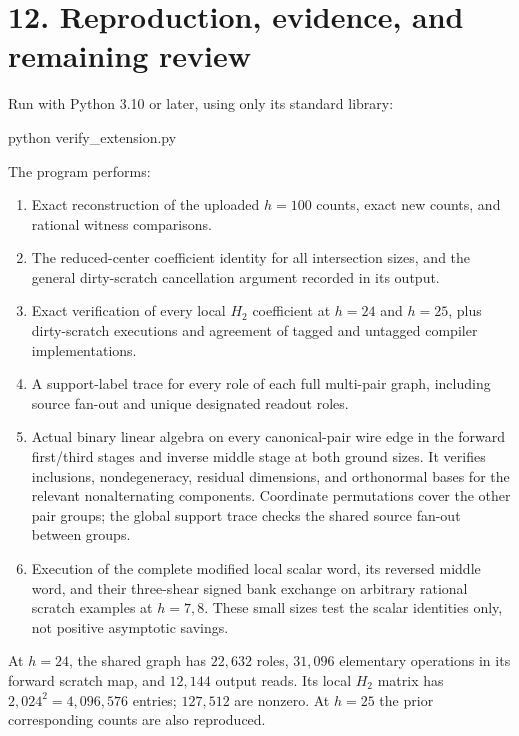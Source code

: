 \documentclass[
  11pt,
  letterpaper,
]{article}
\newenvironment{Shaded}{}{}
\newcommand{\ExtensionTok}[1]{#1}
\newcommand{\NormalTok}[1]{#1}
\begin{document}
\section{12. Reproduction, evidence, and remaining
review}\label{reproduction-evidence-and-remaining-review}

Run with Python 3.10 or later, using only its standard library:

\begin{Shaded}
\begin{Highlighting}[]
\ExtensionTok{python}\NormalTok{ verify\_extension.py}
\end{Highlighting}
\end{Shaded}

The program performs:

\begin{enumerate}
\def\labelenumi{\arabic{enumi}.}
\item
  Exact reconstruction of the uploaded \(h=100\) counts, exact new
  counts, and rational witness comparisons.
\item
  The reduced-center coefficient identity for all intersection sizes,
  and the general dirty-scratch cancellation argument recorded in its
  output.
\item
  Exact verification of every local \(H_2\) coefficient at \(h=24\) and
  \(h=25\), plus dirty-scratch executions and agreement of tagged and
  untagged compiler implementations.
\item
  A support-label trace for every role of each full multi-pair graph,
  including source fan-out and unique designated readout roles.
\item
  Actual binary linear algebra on every canonical-pair wire edge in the
  forward first/third stages and inverse middle stage at both ground
  sizes. It verifies inclusions, nondegeneracy, residual dimensions, and
  orthonormal bases for the relevant nonalternating components.
  Coordinate permutations cover the other pair groups; the global
  support trace checks the shared source fan-out between groups.
\item
  Execution of the complete modified local scalar word, its reversed
  middle word, and their three-shear signed bank exchange on arbitrary
  rational scratch examples at \(h=7,8\). These small sizes test the
  scalar identities only, not positive asymptotic savings.
\end{enumerate}

At \(h=24\), the shared graph has \(22,632\) roles, \(31,096\)
elementary operations in its forward scratch map, and \(12,144\) output
reads. Its local \(H_2\) matrix has \(2,024^2=4,096,576\) entries;
\(127,512\) are nonzero. At \(h=25\) the prior corresponding counts are
also reproduced.
\end{document}
